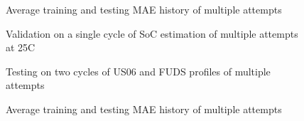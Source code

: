 \begin{figure*}[htbp]
    \centering
    \begin{subfigure}[b]{0.325\textwidth}
        \centering
        
        \caption{Average training and testing MAE history of multiple attempts}
    \end{subfigure}
    \hfill
    \begin{subfigure}[b]{0.325\textwidth}
        \centering
        
        \caption{Validation on a single cycle of SoC estimation of multiple attempts at 25\textdegree{}C}
    \end{subfigure}
    \hfill
    \begin{subfigure}[b]{0.325\textwidth}
        \centering
        
        \caption{Testing on two cycles of US06 and FUDS profiles of multiple attempts}
        \label{subfig:Model-2res-DSTvsFUDS}
    \end{subfigure}
    \begin{subfigure}[b]{0.325\textwidth}
        \centering
        
        \caption{Average training and testing MAE history of multiple attempts}

\end{subfigure}
\end{figure*}
